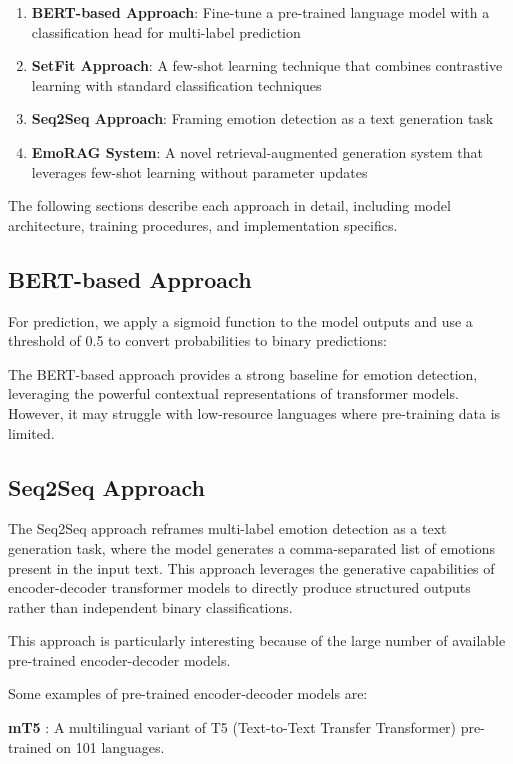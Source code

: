 \documentclass[a4paper,12pt]{extarticle}
\begin{document}
\begin{enumerate}
\item \textbf{BERT-based Approach}: Fine-tune a pre-trained language model with a classification head for multi-label prediction
\item \textbf{SetFit Approach}: A few-shot learning technique that combines contrastive learning with standard classification techniques
\item \textbf{Seq2Seq Approach}: Framing emotion detection as a text generation task
\item \textbf{EmoRAG System}: A novel retrieval-augmented generation system that leverages few-shot learning without parameter updates
\end{enumerate}

The following sections describe each approach in detail, including model architecture, training procedures, and implementation specifics.

\subsection{BERT-based Approach}

For prediction, we apply a sigmoid function to the model outputs and use a threshold of 0.5 to convert probabilities to binary predictions:

The BERT-based approach provides a strong baseline for emotion detection, leveraging the powerful contextual representations of transformer models. However, it may struggle with low-resource languages where pre-training data is limited.

\subsection{Seq2Seq Approach}

The Seq2Seq approach reframes multi-label emotion detection as a text generation task, where the model generates a comma-separated list of emotions present in the input text. This approach leverages the generative capabilities of encoder-decoder transformer models to directly produce structured outputs rather than independent binary classifications.

This approach is particularly interesting because of the large number of available pre-trained encoder-decoder models.

Some examples of pre-trained encoder-decoder models are:

\textbf{mT5} \cite{xue2021mt5massivelymultilingualpretrained}: A multilingual variant of T5 (Text-to-Text Transfer Transformer) pre-trained on 101 languages. 
\end{document}
